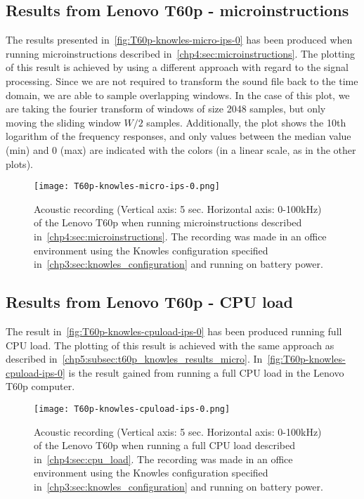 \subsection{Results from Lenovo T60p - microinstructions}\label{chp5:subsec:t60p_knowles_results_micro}
The results presented in~\autoref{fig:T60p-knowles-micro-ips-0} has been produced when running microinstructions described in~\autoref{chp4:sec:microinstructions}.
The plotting of this result is achieved by using a different approach with regard to the signal processing. 
Since we are not required to transform the sound file back to the time domain, we are able to sample overlapping windows.
In the case of this plot, we are taking the fourier transform of windows of size 2048 samples, but only moving the sliding window \({W/2}\) samples.
Additionally, the plot shows the 10th logarithm of the frequency responses, and only values between the median value (min) and 0 (max) are indicated with the colors (in a linear scale, as in the other plots). 
\begin{figure}[ht]
    \centering
    \texttt{[image: T60p-knowles-micro-ips-0.png]}
    \caption{Acoustic recording (Vertical axis: 5 sec. Horizontal axis: 0-100kHz) of the Lenovo T60p when running microinstructions described in~\autoref{chp4:sec:microinstructions}. The recording was made in an office environment using the Knowles configuration specified in~\autoref{chp3:sec:knowles_configuration} and running on battery power. }
    \label{fig:T60p-knowles-micro-ips-0}
\end{figure}
\subsection{Results from Lenovo T60p - CPU load}\label{chp5:subsec:t60p_knowles_results_cpuload}
The result in~\autoref{fig:T60p-knowles-cpuload-ips-0} has been produced running full CPU load. The plotting of this result is achieved with the same approach as described in~\autoref{chp5:subsec:t60p_knowles_results_micro}. 
In~\autoref{fig:T60p-knowles-cpuload-ips-0} is the result gained from running a full CPU load in the Lenovo T60p computer. 
\begin{figure}[ht]
    \centering
    \texttt{[image: T60p-knowles-cpuload-ips-0.png]}
    \caption{Acoustic recording (Vertical axis: 5 sec. Horizontal axis: 0-100kHz) of the Lenovo T60p when running a full CPU load described in~\autoref{chp4:sec:cpu_load}. The recording was made in an office environment using the Knowles configuration specified in~\autoref{chp3:sec:knowles_configuration} and running on battery power. }
    \label{fig:T60p-knowles-cpuload-ips-0}
\end{figure}

